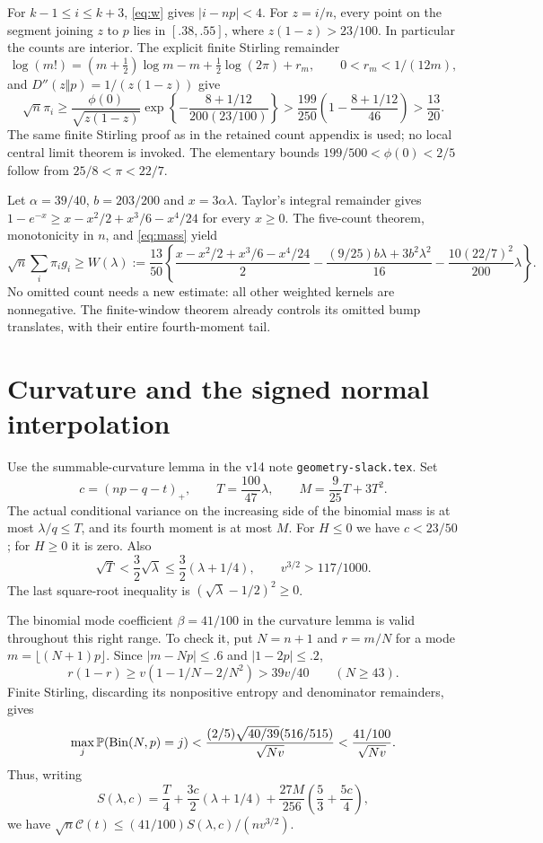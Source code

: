 \documentclass[11pt]{article}
\begin{document}
For $k-1\le i\le k+3$, \eqref{eq:w} gives $|i-np|<4$.
For $z=i/n$, every point on the segment joining $z$ to $p$ lies in
$[.38,.55]$, where $z(1-z)>23/100$. In particular the counts are interior.
The explicit finite Stirling remainder
\[
 \log(m!)=(m+\tfrac12)\log m-m+\tfrac12\log(2\pi)+r_m,
 \qquad0<r_m<1/(12m),
\]
and $D''(z\Vert p)=1/(z(1-z))$ give
\begin{equation}\label{eq:mass}
 \sqrt n\pi_i\ge\frac{\phi(0)}{\sqrt{z(1-z)}}
 \exp\left\{-\frac{8+1/12}{200(23/100)}\right\}
 >\frac{199}{250}\left(1-\frac{8+1/12}{46}\right)>
 \frac{13}{20}.
\end{equation}
The same finite Stirling proof as in the retained count appendix is used;
no local central limit theorem is invoked. The elementary bounds
$199/500<\phi(0)<2/5$ follow from $25/8<\pi<22/7$.

Let $\alpha=39/40$, $b=203/200$ and $x=3\alpha\lambda$.
Taylor's integral remainder gives
$1-e^{-x}\ge x-x^2/2+x^3/6-x^4/24$ for every $x\ge0$.
The five-count theorem, monotonicity in $n$, and \eqref{eq:mass} yield
\begin{equation}\label{eq:W}
 \sqrt n\sum_i\pi_i g_i\ge W(\lambda):=
 \frac{13}{50}\left\{
 \frac{x-x^2/2+x^3/6-x^4/24}{2}
 -\frac{(9/25)b\lambda+3b^2\lambda^2}{16}
 -\frac{10(22/7)^2}{200}\lambda\right\}.
\end{equation}
No omitted count needs a new estimate: all other weighted kernels are
nonnegative. The finite-window theorem already controls its omitted bump
translates, with their entire fourth-moment tail.

\section{Curvature and the signed normal interpolation}
Use the summable-curvature lemma in the v14 note
\texttt{geometry-slack.tex}. Set
\[
 c=(np-q-t)_+,\qquad T=\frac{100}{47}\lambda,
 \qquad M=\frac9{25}T+3T^2.
\]
The actual conditional variance on the increasing side of the binomial
mass is at most $\lambda/q\le T$, and its fourth moment is at most $M$.
For $H\le0$ we have $c<23/50$; for $H\ge0$ it is zero.
Also
\[
 \sqrt T<\frac32\sqrt\lambda\le\frac32(\lambda+1/4),
 \qquad v^{3/2}>117/1000.
\]
The last square-root inequality is $(\sqrt\lambda-1/2)^2\ge0$.

The binomial mode coefficient $\beta=41/100$ in the curvature lemma
is valid throughout this right range. To check it, put $N=n+1$ and
$r=m/N$ for a mode $m=\lfloor(N+1)p\rfloor$. Since
$|m-Np|\le.6$ and $|1-2p|\le.2$,
\[
 r(1-r)\ge v(1-1/N-2/N^2)>39v/40\qquad(N\ge43).
\]
Finite Stirling, discarding its nonpositive entropy and denominator
remainders, gives
\[
 \max_j\mathbb P(\operatorname{Bin}(N,p)=j)
 <\frac{(2/5)\sqrt{40/39}(516/515)}{\sqrt{Nv}}
 <\frac{41/100}{\sqrt{Nv}}.
\]
Thus, writing
\[
 S(\lambda,c)=\frac T4+\frac{3c}{2}(\lambda+1/4)
       +\frac{27M}{256}\left(\frac53+\frac{5c}{4}\right),
\]
we have $\sqrt n\mathcal C(t)\le(41/100)S(\lambda,c)/(nv^{3/2})$.
\end{document}
